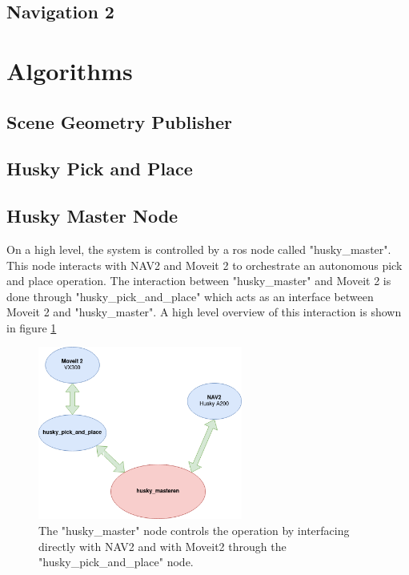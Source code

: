 \subsection{Navigation 2}



\section{Algorithms}

\subsection{Scene Geometry Publisher}

\subsection{Husky Pick and Place}


\subsection{Husky Master Node}
On a high level, the system is controlled by a ros node called "husky\_master". This node interacts with NAV2 and Moveit 2 to orchestrate an autonomous pick and place operation. The interaction between "husky\_master" and Moveit 2 is done through "husky\_pick\_and\_place" which acts as an interface between Moveit 2 and "husky\_master". A high level overview of this interaction is shown in figure \ref{fig:husky_master}

\begin{figure}[H]
  \centering
  \includegraphics[width = 0.6\textwidth]{Figures/software_overview.drawio.png}
  \caption{The "husky\_master" node controls the operation by interfacing directly with NAV2 and with Moveit2 through the "husky\_pick\_and\_place" node.}
  \label{fig:husky_master}
\end{figure}
